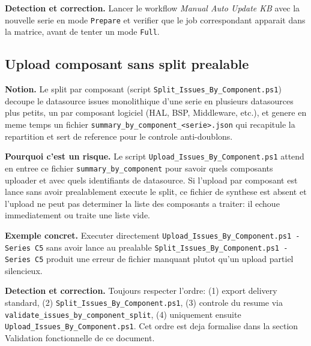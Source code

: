 \documentclass[11pt,a4paper]{article}
\begin{document}
\textbf{Detection et correction.} Lancer le workflow \emph{Manual Auto Update KB}
avec la nouvelle serie en mode \texttt{Prepare} et verifier que le job
correspondant apparait dans la matrice, avant de tenter un mode \texttt{Full}.

\subsection{Upload composant sans split prealable}
\textbf{Notion.} Le \og split par composant \fg{} (script
\texttt{Split\_Issues\_By\_Component.ps1}) decoupe le datasource \og issues \fg{}
monolithique d'une serie en plusieurs datasources plus petits, un par composant
logiciel (HAL, BSP, Middleware, etc.), et genere en meme temps un fichier
\texttt{summary\_by\_component\_<serie>.json} qui recapitule la repartition et
sert de reference pour le controle anti-doublons.

\textbf{Pourquoi c'est un risque.} Le script
\texttt{Upload\_Issues\_By\_Component.ps1} attend en entree ce fichier
\texttt{summary\_by\_component} pour savoir quels composants uploader et avec
quels identifiants de datasource. Si l'upload par composant est lance sans avoir
prealablement execute le split, ce fichier de synthese est absent et l'upload ne
peut pas determiner la liste des composants a traiter: il echoue immediatement
ou traite une liste vide.

\textbf{Exemple concret.} Executer directement
\texttt{Upload\_Issues\_By\_Component.ps1 -Series C5} sans avoir lance au
prealable \texttt{Split\_Issues\_By\_Component.ps1 -Series C5} produit une erreur
de fichier manquant plutot qu'un upload partiel silencieux.

\textbf{Detection et correction.} Toujours respecter l'ordre: (1) export
delivery standard, (2) \texttt{Split\_Issues\_By\_Component.ps1}, (3) controle du
resume via \texttt{validate\_issues\_by\_component\_split}, (4) uniquement
ensuite \texttt{Upload\_Issues\_By\_Component.ps1}. Cet ordre est deja formalise
dans la section \og Validation fonctionnelle \fg{} de ce document.
\end{document}

